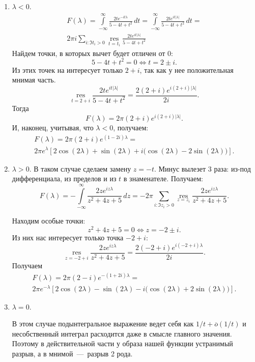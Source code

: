 \documentclass[12pt, a4paper]{article} %
\DeclareMathOperator*{\res}{res}
\begin{document}
\begin{enumerate}
\item $\lambda < 0$.
    \begin{multline*}
        F(\lambda) =
        \int\limits_{-\infty}^{\infty}
           \frac{2te^{-it\lambda}}{5 - 4t + t^2}\,dt =
        \int\limits_{-\infty}^{\infty}
           \frac{2te^{it\lvert \lambda \rvert}}{5-4t+t^2}\,dt =\\
           2\pi i \sum\limits_{i\colon \Im t_i > 0} \res\limits_{t=t_i}{\frac{2te^{it\lvert \lambda \rvert}}{5-4t+t^2}}        
    \end{multline*}
    Найдем точки, в которых вычет будет отличен от $0$:
     \[
        5 - 4t + t^2 = 0 \iff t = 2 \pm i
    .\] 
    Из этих точек на интересует только $2 + i$, так как у нее положительная
    мнимая часть.
    \[
        \res\limits_{t=2+i} \frac{2te^{it\lvert \lambda \rvert }}{5-4t+t^2} =
        \frac{2(2+i)e^{i(2+i)\lvert \lambda \rvert}}{2i}
    .\] 
    Тогда
    \[
        F(\lambda) = 2\pi(2+i)e^{i(2+i)\lvert \lambda \rvert}
    .\] 
    И, наконец, учитывая, что $\lambda < 0$, получаем:
\begin{multline*}
        F(\lambda) = 2\pi(2+i)e^{(1-2i)\lambda} =\\
        2\pi e^\lambda\left[ 2\cos(2\lambda) + \sin(2\lambda) +
        i\bigl( \cos(2\lambda) - 2\sin(2\lambda) \bigr)\right]
.\end{multline*}

\item $\lambda > 0$.
    В таком случае сделаем замену $z = -t$.
    Минус вылезет 3 раза: из-под дифференциала, из пределов и из $t$ в знаменателе.
    Получаем:
     \[
        F(\lambda) = -\int\limits_{-\infty}^{\infty} 
            \frac{2ze^{iz\lambda}}{z^2 + 4z + 5}\,dz =
        -2\pi \sum\limits_{i\colon \Im z_i > 0} \res\limits_{z=z_i}
            \frac{2ze^{iz\lambda}}{z^2 + 4z + 5}
    .\] 

    Находим особые точки:
    \[
        z^2 + 4z + 5 = 0 \iff z = -2 \pm i
    .\] 
    Из них нас интересует только точка $-2 + i$:
     \[
        \res\limits_{z = -2+i} \frac{2ze^{iz\lambda}}{z^2 + 4z + 5} =
        \frac{2(-2+i)e^{i(-2+i)\lambda}}{2i}
    .\] 
    Получаем 
    \begin{multline*}
        F(\lambda) = 2\pi (2 - i)e^{-(1+2i)\lambda} =\\
        2\pi e^{-\lambda}\left[ 2\cos(2\lambda) - \sin(2\lambda) 
        -i \bigl( \cos(2\lambda) + 2\sin(2\lambda) \bigr)\right]
    .\end{multline*}
    
\item $\lambda = 0$.

    В этом случае подынтегральное выражение ведет себя как 
    $1\!/ t + \overline{o}(1\!/ t)$ и несобственный интеграл расходится
    даже в смысле главного значения.
    Поэтому в действительной части у образа нашей функции устранимый разрыв,
    а в мнимой~---~разрыв 2 рода.
\end{enumerate} 
\end{document}
